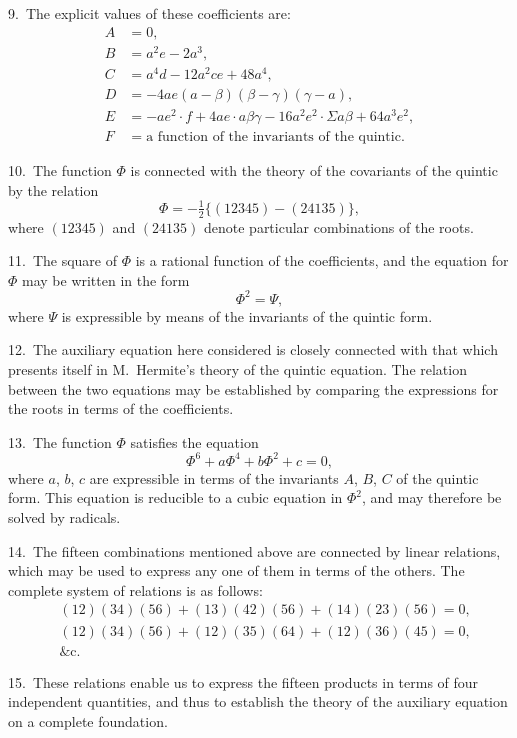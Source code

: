 \documentclass[11pt,a4paper]{article}
\theoremstyle{plain}
\theoremstyle{definition}
\theoremstyle{remark}
\begin{document}
9.\ The explicit values of these coefficients are:
\begin{align*}
A &= 0,\\
B &= a^2e - 2a^3,\\
C &= a^4d - 12a^2ce + 48a^4,\\
D &= -4ae(a-\beta)(\beta-\gamma)(\gamma-a),\\
E &= -ae^2\cdot f + 4ae\cdot a\beta\gamma - 16a^2e^2\cdot\Sigma a\beta + 64a^3e^2,\\
F &= \text{a function of the invariants of the quintic}.
\end{align*}

\newpage
\setcounter{page}{325}

10.\ The function $\Phi$ is connected with the theory of the covariants of the quintic by the relation
\[
\Phi = -\tfrac{1}{2}\{(12345)-(24135)\},
\]
where $(12345)$ and $(24135)$ denote particular combinations of the roots.

11.\ The square of $\Phi$ is a rational function of the coefficients, and the equation for $\Phi$ may be written in the form
\[
\Phi^2 = \Psi,
\]
where $\Psi$ is expressible by means of the invariants of the quintic form.

\newpage
\setcounter{page}{326}

12.\ The auxiliary equation here considered is closely connected with that which presents itself in M.~Hermite's theory of the quintic equation. The relation between the two equations may be established by comparing the expressions for the roots in terms of the coefficients.

13.\ The function $\Phi$ satisfies the equation
\[
\Phi^6 + a\Phi^4 + b\Phi^2 + c = 0,
\]
where $a$, $b$, $c$ are expressible in terms of the invariants $A$, $B$, $C$ of the quintic form. This equation is reducible to a cubic equation in $\Phi^2$, and may therefore be solved by radicals.

\newpage
\setcounter{page}{327}

14.\ The fifteen combinations mentioned above are connected by linear relations, which may be used to express any one of them in terms of the others. The complete system of relations is as follows:
\begin{align*}
&(12)(34)(56) + (13)(42)(56) + (14)(23)(56) = 0,\\
&(12)(34)(56) + (12)(35)(64) + (12)(36)(45) = 0,\\
&\text{\&c.}
\end{align*}

15.\ These relations enable us to express the fifteen products in terms of four independent quantities, and thus to establish the theory of the auxiliary equation on a complete foundation.
\end{document}
